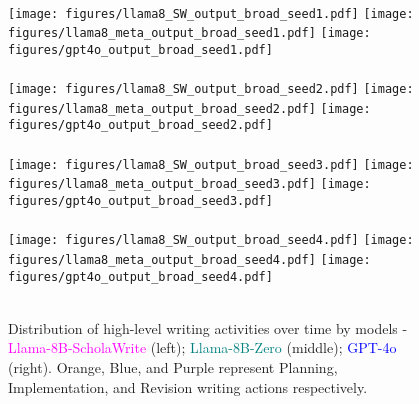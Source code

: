 \begin{figure*}
    \centering
    \makebox[0.33\textwidth]{\small \textcolor{magenta}{Llama-8B-ScholaWrite}}
    \makebox[0.32\textwidth]{\small \textcolor{teal}{Llama-8B-Zero}}
    \makebox[0.32\textwidth]{\small \textcolor{blue}{GPT-4o}} 
    \\[1em]
        \texttt{[image: figures/llama8\_SW\_output\_broad\_seed1.pdf]}
        \texttt{[image: figures/llama8\_meta\_output\_broad\_seed1.pdf]}
        \texttt{[image: figures/gpt4o\_output\_broad\_seed1.pdf]}
        \\[2pt]
    \\[0.5em]
        \texttt{[image: figures/llama8\_SW\_output\_broad\_seed2.pdf]}
        \texttt{[image: figures/llama8\_meta\_output\_broad\_seed2.pdf]}
        \texttt{[image: figures/gpt4o\_output\_broad\_seed2.pdf]}
        \\[2pt]
    \\[0.5em]
        \texttt{[image: figures/llama8\_SW\_output\_broad\_seed3.pdf]}
        \texttt{[image: figures/llama8\_meta\_output\_broad\_seed3.pdf]}
        \texttt{[image: figures/gpt4o\_output\_broad\_seed3.pdf]}
        \\[2pt]
    \\[0.5em]
        \texttt{[image: figures/llama8\_SW\_output\_broad\_seed4.pdf]}
        \texttt{[image: figures/llama8\_meta\_output\_broad\_seed4.pdf]}
        \texttt{[image: figures/gpt4o\_output\_broad\_seed4.pdf]}
        \\[2pt]
    \\[0.5em]
    \caption{Distribution of high-level writing activities over time by models - \textcolor{magenta}{Llama-8B-ScholaWrite} (left); \textcolor{teal}{Llama-8B-Zero} (middle); \textcolor{blue}{GPT-4o} (right). Orange, Blue, and Purple represent Planning, Implementation, and Revision writing actions respectively. }
    \label{fig:writing-step-broad-all-model}
\end{figure*}

